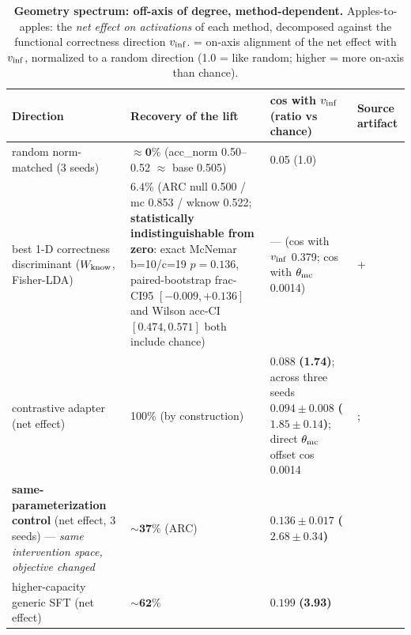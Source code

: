 \begin{table}[tbp]
\centering
\begin{threeparttable}
\caption{\textbf{Geometry spectrum: off-axis of degree, method-dependent.}
Apples-to-apples: the \emph{net effect on activations} of each method, decomposed
against the functional correctness direction $\vinf$.  = on-axis
alignment of the net effect with $\vinf$, normalized to a random direction (1.0 =
like random; higher = more on-axis than chance).}
\label{tab:spectrum}
\footnotesize
\begin{tabular}{L{3.2cm} L{6.2cm} L{2.8cm} L{2.6cm}}
\toprule
Direction & Recovery of the lift & cos with $\vinf$ (ratio vs chance) & Source
artifact \\
\midrule
random norm-matched (3 seeds) & $\mathbf{{\approx}0\%}$ (acc\_norm 0.50--0.52
${\approx}$ base 0.505) & 0.05 (1.0) & 
 \\
best 1-D correctness discriminant ($W_{\mathrm{know}}$, Fisher-LDA) & $\mathbf{6.4\%}$ (ARC null 0.500 / mc
0.853 / wknow 0.522; \textbf{statistically indistinguishable from zero}: exact
McNemar b=10/c=19 $p=0.136$, paired-bootstrap frac-CI95 $[-0.009, +0.136]$ and
Wilson acc-CI $[0.474, 0.571]$ both include chance) & --- (cos with $\vinf$ 0.379;
cos with $\theta_{\mathrm{mc}}$ 0.0014) &  +
 \\
contrastive adapter (net effect) & 100\% (by construction) & $\mathbf{0.088}$
\textbf{(1.74)}; across three seeds $0.094 \pm 0.008$ \textbf{($1.85 \pm 0.14$)};
direct $\theta_{\mathrm{mc}}$ offset cos 0.0014 & 
;  \\
\textbf{same-parameterization control} (net effect, 3 seeds) --- \emph{same
intervention space, objective changed} & ${\sim}\mathbf{37\%}$ (ARC) &
$\mathbf{0.136 \pm 0.017}$ \textbf{($2.68 \pm 0.34$)} &
 \\
higher-capacity generic SFT (net effect) & ${\sim}\mathbf{62\%}$ & $\mathbf{0.199}$
\textbf{(3.93)} &   \\

\end{tabular}
\end{threeparttable}
\end{table}
